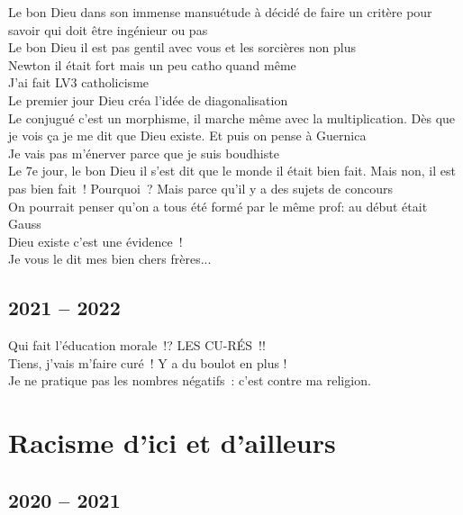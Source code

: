 \documentclass[french, a4paper, openany]{book}
\begin{document}
	\noindent \og Le bon Dieu dans son immense mansuétude à décidé de faire un critère pour savoir qui doit être ingénieur ou pas \fg \\
	\og Le bon Dieu il est pas gentil avec vous et les sorcières non plus \fg \\
	\og Newton il était fort mais un peu catho quand même \fg \\
	\og J'ai fait LV3 catholicisme \fg \\
	\og Le premier jour Dieu créa l'idée de diagonalisation \fg \\
	\og Le conjugué c'est un morphisme, il marche même avec la multiplication. Dès que je vois ça je me dit que Dieu existe. Et puis on pense à Guernica \fg \\
	\og Je vais pas m'énerver parce que je suis boudhiste \fg \\
	\og Le 7e jour, le bon Dieu il s'est dit que le monde il était bien fait. Mais non, il est pas bien fait~! Pourquoi~? Mais parce qu'il y a des sujets de concours \fg \\
	\og On pourrait penser qu'on a tous été formé par le même prof: au début était Gauss \fg \\
	\og Dieu existe c'est une évidence~! \fg \\
	\og Je vous le dit mes bien chers frères... \fg \\

	\subsection*{2021 -- 2022}
	
	\noindent \og Qui fait l'éducation morale~!? LES CU-RÉS~!! \fg \\
	\og Tiens, j'vais m'faire curé~! Y a du boulot en plus ! \fg \\
	\og Je ne pratique pas les nombres négatifs~: c'est contre ma religion. \fg \\

\section*{Racisme d'ici et d'ailleurs}

	\subsection*{2020 -- 2021}
\end{document}
